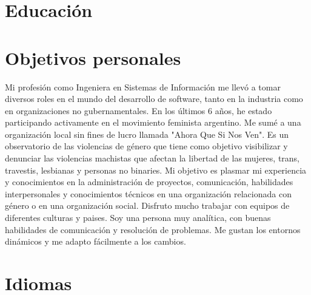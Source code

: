 \documentclass[11pt,a4paper,sans]{moderncv}
\begin{document}
\makecvtitle

\section{Educación}



\section{Objetivos personales}

Mi profesión como Ingeniera en Sistemas de Información me llevó a tomar diversos roles en el mundo del desarrollo de software, tanto en la industria como en organizaciones no gubernamentales. En los últimos 6 años, he estado participando activamente en el movimiento feminista argentino. Me sumé a una organización local sin fines de lucro llamada "Ahora Que Si Nos Ven". Es un observatorio de las violencias de género que tiene como objetivo visibilizar y denunciar las violencias machistas que afectan la libertad de las mujeres, trans, travestis, lesbianas y personas no binaries.
\newline
Mi objetivo es plasmar mi experiencia y conocimientos en la administración de proyectos, comunicación, habilidades interpersonales y conocimientos técnicos en una organización relacionada con género o en una organización social.
Disfruto mucho trabajar con equipos de diferentes culturas y paises. Soy una persona muy analítica, con buenas habilidades de comunicación y resolución de problemas. Me gustan los entornos dinámicos y me adapto fácilmente a los cambios.

\section{Idiomas}

\end{document}
